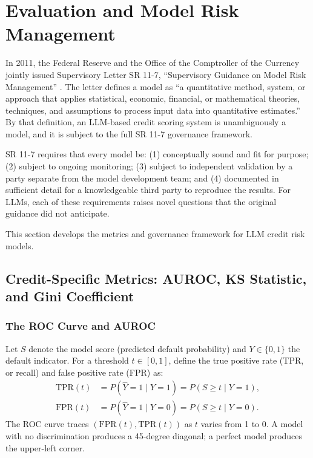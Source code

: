 \section{Evaluation and Model Risk Management}
\label{sec:model-risk}

\begin{context}

In 2011, the Federal Reserve and the Office of the Comptroller of the Currency jointly issued Supervisory Letter SR 11-7, ``Supervisory Guidance on Model Risk Management'' \cite{sr117}. The letter defines a model as ``a quantitative method, system, or approach that applies statistical, economic, financial, or mathematical theories, techniques, and assumptions to process input data into quantitative estimates.'' By that definition, an LLM-based credit scoring system is unambiguously a model, and it is subject to the full SR 11-7 governance framework.

SR 11-7 requires that every model be: (1) conceptually sound and fit for purpose; (2) subject to ongoing monitoring; (3) subject to independent validation by a party separate from the model development team; and (4) documented in sufficient detail for a knowledgeable third party to reproduce the results. For LLMs, each of these requirements raises novel questions that the original guidance did not anticipate.

This section develops the metrics and governance framework for LLM credit risk models.

\subsection{Credit-Specific Metrics: AUROC, KS Statistic, and Gini Coefficient}
\label{subsec:credit-metrics}

\subsubsection*{The ROC Curve and AUROC}

Let $S$ denote the model score (predicted default probability) and $Y \in \{0, 1\}$ the default indicator. For a threshold $t \in [0, 1]$, define the true positive rate (TPR, or recall) and false positive rate (FPR) as:
\begin{align}
  \text{TPR}(t) &= P(\hat{Y} = 1 \mid Y = 1) = P(S \geq t \mid Y = 1), \label{eq:tpr} \\
  \text{FPR}(t) &= P(\hat{Y} = 1 \mid Y = 0) = P(S \geq t \mid Y = 0). \label{eq:fpr}
\end{align}
The ROC curve traces $(\text{FPR}(t), \text{TPR}(t))$ as $t$ varies from 1 to 0. A model with no discrimination produces a 45-degree diagonal; a perfect model produces the upper-left corner.


\end{context}
